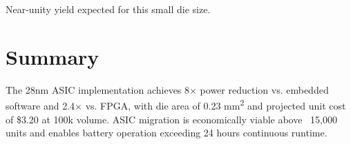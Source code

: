 Near-unity yield expected for this small die size.

\section{Summary}

The 28nm ASIC implementation achieves 8$\times$ power reduction vs. embedded software and 2.4$\times$ vs. FPGA, with die area of 0.23 mm\textsuperscript{2} and projected unit cost of \$3.20 at 100k volume. ASIC migration is economically viable above ~15,000 units and enables battery operation exceeding 24 hours continuous runtime.

\newpage